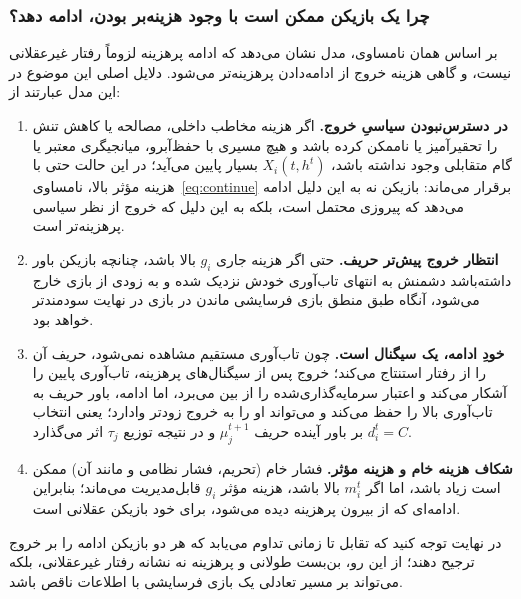 \documentclass[12pt]{article}
\begin{document}
\subsubsection*{چرا یک بازیکن ممکن است با وجود هزینه‌بر بودن، ادامه دهد؟}

بر اساس همان نامساوی، مدل نشان می‌دهد که ادامه پرهزینه لزوماً رفتار غیرعقلانی نیست، و
گاهی هزینه خروج از ادامه‌دادن پرهزینه‌تر 
می‌شود. دلایل اصلی این موضوع در این مدل عبارتند از:

\begin{enumerate}
    \item \textbf{در دسترس‌نبودن سیاسیِ خروج.}
    اگر هزینه مخاطب داخلی، مصالحه یا کاهش تنش را 
    تحقیرآمیز
     یا ناممکن کرده باشد و هیچ مسیری با
         حفظ‌آبرو، میانجیگری معتبر یا گام متقابلی وجود نداشته باشد،
     $X_i(t,h^t)$
      بسیار پایین می‌آید؛
    در این حالت حتی با هزینه مؤثر بالا، نامساوی~\eqref{eq:continue} 
    برقرار می‌ماند:
    بازیکن نه به این دلیل ادامه می‌دهد که پیروزی محتمل است، بلکه
     به این دلیل که خروج از نظر سیاسی پرهزینه‌تر است.
    \item \textbf{انتظار خروج پیش‌تر حریف.}
    حتی اگر هزینه جاری $g_i$ 
    بالا باشد، چنانچه بازیکن باور داشته‌باشد دشمنش به انتهای
    تاب‌آوری خودش نزدیک شده و به زودی از بازی خارج می‌شود، آنگاه طبق منطق بازی
    فرسایشی ماندن در بازی در نهایت سودمندتر خواهد بود.
    \item \textbf{خودِ ادامه، یک سیگنال است.}
    چون تاب‌آوری مستقیم مشاهده نمی‌شود، حریف آن را از رفتار استنتاج می‌کند؛
     خروج پس از سیگنال‌های پرهزینه،
    تاب‌آوری پایین را آشکار می‌کند و اعتبار سرمایه‌گذاری‌شده را از بین می‌برد،
     اما ادامه، باور حریف به تاب‌آوری بالا
    را حفظ می‌کند و می‌تواند
     او را به خروج زودتر وادارد؛ یعنی انتخاب 
     $d_i^t = C$ بر باور آینده حریف
    $\mu_j^{t+1}$
     و در نتیجه توزیع 
     $\tau_j$
      اثر می‌گذارد.
      
    \item \textbf{شکاف هزینه خام و هزینه مؤثر.}
    فشار خام 
    (تحریم، فشار نظامی و مانند آن) ممکن است زیاد باشد، 
    اما اگر 
    $m_i^t$ بالا باشد،
    هزینه مؤثر $g_i$ 
    قابل‌مدیریت می‌ماند؛ بنابراین ادامه‌ای که از بیرون پرهزینه دیده می‌شود،
    برای خود بازیکن عقلانی است.
\end{enumerate}

در نهایت توجه کنید که تقابل تا زمانی تداوم می‌یابد که هر دو
 بازیکن ادامه را بر خروج ترجیح دهند؛
از این رو، بن‌بست طولانی و پرهزینه نه نشانه رفتار غیرعقلانی، بلکه می‌تواند بر مسیر تعادلی
یک بازی فرسایشی با اطلاعات ناقص باشد.
\end{document}
